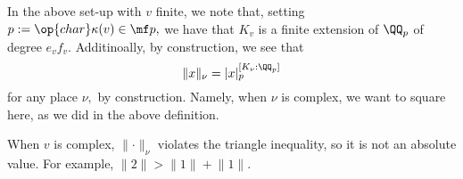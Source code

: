 \documentclass[../notes.tex]{subfiles}
\begin{document}
In the above set-up with $v$ finite, we note that, setting $p:=\op{char}\kappa(v)\in\mf p,$ we have that $K_v$ is a finite extension of $\QQ_p$ of degree $e_vf_v.$ Additinoally, by construction, we see that
\[\lVert x\rVert_\nu=|x|_p^{[K_\nu:\QQ_p]}\]
for any place $\nu,$ by construction. Namely, when $\nu$ is complex, we want to square here, as we did in the above definition.
\begin{warn}
	When $v$ is complex, $\lVert\cdot\rVert_\nu$ violates the triangle inequality, so it is not an absolute value. For example, $\lVert2\rVert>\lVert1\rVert+\lVert1\rVert.$
\end{warn}
\end{document}
